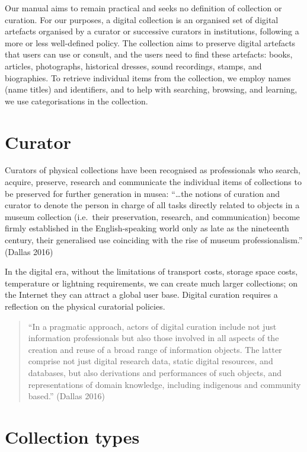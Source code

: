 \documentclass[
  letterpaper,
  DIV=11,
  numbers=noendperiod]{scrreprt}
\begin{document}
Our manual aims to remain practical and seeks no definition of
collection or curation. For our purposes, a digital collection is an
organised set of digital artefacts organised by a curator or successive
curators in institutions, following a more or less well-defined policy.
The collection aims to preserve digital artefacts that users can use or
consult, and the users need to find these artefacts: books, articles,
photographs, historical dresses, sound recordings, stamps, and
biographies. To retrieve individual items from the collection, we employ
names (name titles) and identifiers, and to help with searching,
browsing, and learning, we use categorisations in the collection.

\section{Curator}\label{curator}

Curators of physical collections have been recognised as professionals
who search, acquire, preserve, research and communicate the individual
items of collections to be preserved for further generation in musea:
``\ldots the notions of curation and curator to denote the person in
charge of all tasks directly related to objects in a museum collection
(i.e.~their preservation, research, and communication) become firmly
established in the English-speaking world only as late as the nineteenth
century, their generalised use coinciding with the rise of museum
professionalism.'' (Dallas 2016)

In the digital era, without the limitations of transport costs, storage
space costs, temperature or lightning requirements, we can create much
larger collections; on the Internet they can attract a global user base.
Digital curation requires a reflection on the physical curatorial
policies.

\begin{quote}
``In a pragmatic approach, actors of digital curation include not just
information professionals but also those involved in all aspects of the
creation and reuse of a broad range of information objects. The latter
comprise not just digital research data, static digital resources, and
databases, but also derivations and performances of such objects, and
representations of domain knowledge, including indigenous and community
based.'' (Dallas 2016)
\end{quote}

\section{Collection types}\label{collection-types}
\end{document}
